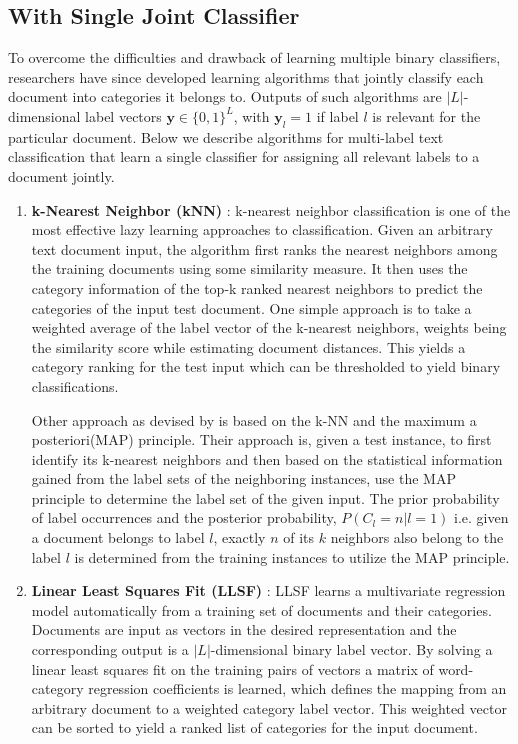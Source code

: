 \subsection{With Single Joint Classifier}
To overcome the difficulties and drawback of learning multiple binary classifiers, researchers have since developed learning algorithms that jointly classify each document into categories it belongs to. Outputs of such algorithms are $|L|$-dimensional label vectors $\boldsymbol{y} \in \{0, 1\}^{L}$, with $\boldsymbol{y}_{l} = 1$ if label $l$ is relevant for the particular document. Below we describe algorithms for multi-label text classification that learn a single classifier for assigning all relevant labels to a document jointly.
\begin{enumerate}
\item{\textbf{k-Nearest Neighbor (kNN)} : }k-nearest neighbor classification is one of the most effective lazy learning approaches to classification. Given an arbitrary text document input, the algorithm first ranks the nearest neighbors among the training documents using some similarity measure. It then uses the category information of the top-k ranked nearest neighbors to predict the categories of the input test document. One simple approach is to take a weighted average of the label vector of the k-nearest neighbors, weights being the similarity score while estimating document distances. This yields a category ranking for the test input which can be thresholded to yield binary classifications.

Other approach as devised by \cite{zhang2007ml} is based on the k-NN and the maximum a posteriori(MAP) principle. Their approach is, given a test instance, to first identify its k-nearest neighbors and then based on the statistical information gained from the label sets of the neighboring instances, use the MAP principle to determine the label set of the given input. The prior probability of label occurrences and the posterior probability, $P(C_{l}=n | l=1)$ i.e. given a document belongs to label $l$, exactly $n$ of its $k$ neighbors also belong to the label $l$ is determined from the training instances to utilize the MAP principle.

\item{\textbf{Linear Least Squares Fit (LLSF)} : }LLSF\citep{yang1992linear} learns a multivariate regression model automatically from a training set of documents and their categories. Documents are input as vectors in the desired representation and the corresponding output is a $|L|$-dimensional binary label vector. By solving a linear least squares fit on the training pairs of vectors a matrix of word-category regression coefficients is learned, which defines the mapping from an arbitrary document to a weighted category label vector. This weighted vector can be sorted to yield a ranked list of categories for the input document.


\end{enumerate}
